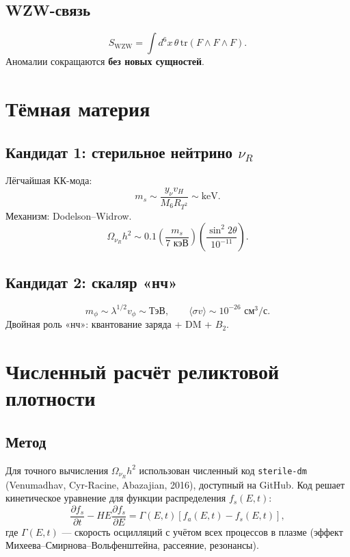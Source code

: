 \documentclass[11pt,letterpaper]{article}
\begin{document}
\subsection{WZW-связь}
\begin{equation}
S_{\text{WZW}} = \int d^6 x \, \theta \, \text{tr}(F \wedge F \wedge F).
\end{equation}
Аномалии сокращаются \textbf{без новых сущностей}.

\section{Тёмная материя}

\subsection{Кандидат 1: стерильное нейтрино $\nu_R$}
Лёгчайшая КК-мода:
\begin{equation}
m_s \sim \frac{y_\nu v_H}{M_6 R_{T^2}} \sim \text{keV}.
\end{equation}
Механизм: Dodelson--Widrow.
\begin{equation}
\Omega_{\nu_R} h^2 \sim 0.1 \left(\frac{m_s}{7 \text{ кэВ}}\right) \left(\frac{\sin^2 2\theta}{10^{-11}}\right).
\end{equation}

\subsection{Кандидат 2: скаляр «нч»}
\begin{equation}
m_\phi \sim \lambda^{1/2} v_\phi \sim \text{ТэВ}, \qquad \langle \sigma v \rangle \sim 10^{-26} \text{ см}^3/\text{с}.
\end{equation}
Двойная роль «нч»: квантование заряда + DM + $B_2$.

\section{Численный расчёт реликтовой плотности}
\label{sec:numerical}

\subsection{Метод}
Для точного вычисления $\Omega_{\nu_R} h^2$ использован численный код \texttt{sterile-dm} (Venumadhav, Cyr-Racine, Abazajian, 2016), доступный на GitHub. Код решает кинетическое уравнение для функции распределения $f_s(E, t)$:
\begin{equation}
\frac{\partial f_s}{\partial t} - H E \frac{\partial f_s}{\partial E} = \Gamma(E, t) \left[ f_a(E, t) - f_s(E, t) \right],
\end{equation}
где $\Gamma(E, t)$ --- скорость осцилляций с учётом всех процессов в плазме (эффект Михеева--Смирнова--Вольфенштейна, рассеяние, резонансы).
\end{document}

